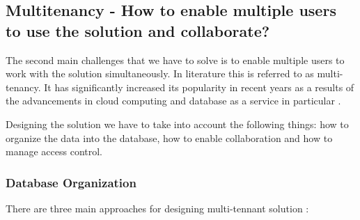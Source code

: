 \documentclass[a4paper, notitlepage]{article}
\begin{document}
\subsection{Multitenancy - How to enable multiple users to use the solution and collaborate?}
The second main challenges that we have to solve is to enable multiple users to work with the solution simultaneously. In literature this is referred to as multi-tenancy. It has significantly increased its popularity in recent years as a results of the advancements in cloud computing and database as a service in particular \cite{Hui}. 

Designing the solution we have to take into account the following things: how to organize the data into the database, how to enable collaboration and how to manage access control.

\subsubsection{Database Organization}
There are three main approaches for designing multi-tennant solution \cite{Hui}:
\end{document}
